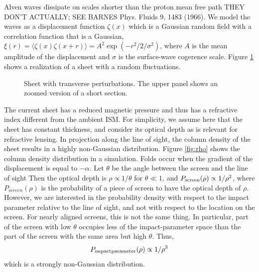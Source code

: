\documentclass[useAMS,usenatbib]{mn2e}
\begin{document}
Alven waves dissipate on scales shorter than the proton mean free
path THEY DON'T ACTUALLY; SEE BARNES Phys. Fluids 9, 1483 (1966).  We model the waves as a displacement function $\zeta(x)$
which is a Gaussian random field with a correlation function that is a
Gaussian, $\xi(r)=\langle \zeta(x)
\zeta(x+r)\rangle=A^2\exp(-r^2/2/\sigma^2)$, where $A$ is the mean amplitude
of the displacement and $\sigma$ is the surface-wave
cogerence scale.  Figure \ref{fig:sheet} shows a realization of a
sheet with a random fluctuations.

\begin{figure}
\centerline{}
\caption{Sheet with transverse perturbations.  The upper panel shows
  an zoomed version of a short section.}
\label{fig:sheet}
\end{figure}

The current sheet has a reduced magnetic pressure and thus has a refractive index different
from the ambient ISM. For simplicity, we assume here that the sheet has constant thickness, and
consider its optical depth as is relevant for refractive lensing.
In projection along the line of sight, the column density of the  sheet 
results in a highly non-Gaussian
distribution. Figure \ref{fig:rho} shows the column density distribution in a
simulation.  Folds occur when the gradient of the displacement is
equal to $-\alpha$.  
%
% 
Let $\theta$ be the angle between the screen and the line of sight
Then the optical depth is $\rho\propto1/\theta$ for
$\theta\ll 1$, and  $P_{\rm screen}(\rho)\propto 1/\rho^2$, where $P_{screen}(\rho)$
is the probability of a piece of screen to have the optical depth of $\rho$.
However, we are interested in the probability density with respect to the impact parameter relative
to the line of sight, and not with respect to the location on the screen. For nearly aligned screens, this
is not the same thing. In particular, part of the screen with low $\theta$ occupies less of the
impact-parameter space than the part of the screen with the same area but high $\theta$. Thus,
\begin{equation}
P_{\rm impact parameter}(\rho)\propto 1/\rho^3
\label{eqn:prho}
\end{equation}
which is a strongly non-Gaussian distribution.
\end{document}

